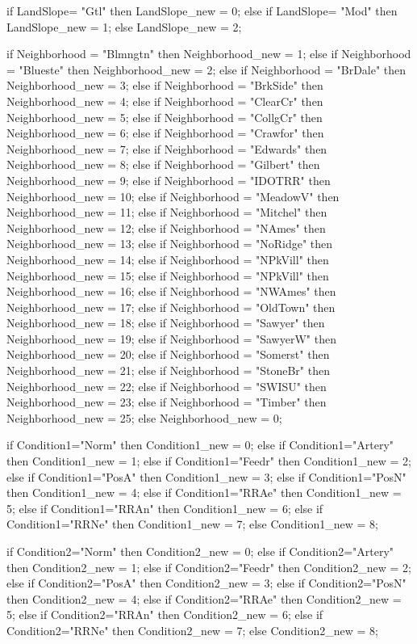 		if LandSlope= "Gtl" 	 then LandSlope_new = 0;
		else if LandSlope= "Mod" then LandSlope_new = 1;
		else LandSlope_new = 2;

		if Neighborhood = "Blmngtn" 		then Neighborhood_new = 1;
		else if Neighborhood = "Blueste" 	then Neighborhood_new = 2;
		else if Neighborhood = "BrDale" 	then Neighborhood_new = 3;
		else if Neighborhood = "BrkSide" 	then Neighborhood_new = 4;
		else if Neighborhood = "ClearCr" 	then Neighborhood_new = 5;
		else if Neighborhood = "CollgCr" 	then Neighborhood_new = 6;
		else if Neighborhood = "Crawfor" 	then Neighborhood_new = 7;
		else if Neighborhood = "Edwards" 	then Neighborhood_new = 8;
		else if Neighborhood = "Gilbert" 	then Neighborhood_new = 9;
		else if Neighborhood = "IDOTRR" 	then Neighborhood_new = 10;
		else if Neighborhood = "MeadowV" 	then Neighborhood_new = 11;
		else if Neighborhood = "Mitchel" 	then Neighborhood_new = 12;
		else if Neighborhood = "NAmes" 		then Neighborhood_new = 13;
		else if Neighborhood = "NoRidge" 	then Neighborhood_new = 14;
		else if Neighborhood = "NPkVill" 	then Neighborhood_new = 15;
		else if Neighborhood = "NPkVill" 	then Neighborhood_new = 16;
		else if Neighborhood = "NWAmes"		then Neighborhood_new = 17;
		else if Neighborhood = "OldTown" 	then Neighborhood_new = 18;
		else if Neighborhood = "Sawyer" 	then Neighborhood_new = 19;
		else if Neighborhood = "SawyerW" 	then Neighborhood_new = 20;
		else if Neighborhood = "Somerst" 	then Neighborhood_new = 21;
		else if Neighborhood = "StoneBr" 	then Neighborhood_new = 22;
		else if Neighborhood = "SWISU" 		then Neighborhood_new = 23;
		else if Neighborhood = "Timber" 	then Neighborhood_new = 25;
		else  	Neighborhood_new = 0;

		if Condition1="Norm" 		then Condition1_new = 0;
		else if Condition1="Artery" then Condition1_new = 1;
		else if Condition1="Feedr" 	then Condition1_new = 2;
		else if Condition1="PosA" 	then Condition1_new = 3;
		else if Condition1="PosN" 	then Condition1_new = 4;
		else if Condition1="RRAe" 	then Condition1_new = 5;
		else if Condition1="RRAn" 	then Condition1_new = 6;
		else if Condition1="RRNe" 	then Condition1_new = 7;
		else 	Condition1_new = 8;

		if Condition2="Norm" 		then Condition2_new = 0;
		else if Condition2="Artery" then Condition2_new = 1;
		else if Condition2="Feedr" 	then Condition2_new = 2;
		else if Condition2="PosA" 	then Condition2_new = 3;
		else if Condition2="PosN" 	then Condition2_new = 4;
		else if Condition2="RRAe" 	then Condition2_new = 5;
		else if Condition2="RRAn" 	then Condition2_new = 6;
		else if Condition2="RRNe" 	then Condition2_new = 7;
		else 	Condition2_new = 8;


